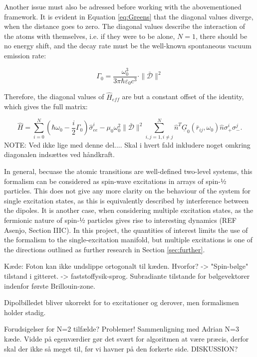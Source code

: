 \documentclass{article}
\begin{document}
Another issue must also be adressed before working with the abovementioned framework. It is evident in Equation \ref{eq:Greens} that the diagonal values diverge, when the distance goes to zero. The diagonal values describe the interaction of the atoms with themselves, i.e. if they were to be alone, $N = 1$, there should be no energy shift, and the decay rate must be the well-known spontaneous vacuum emission rate:

\begin{equation}\label{eq:vac_emission_rate}
    \Gamma_0 = \frac{\omega_0^3}{3\pi \hbar \varepsilon_0 c^3} \cdot \|\bar{\mathscr{D}}\|^2
\end{equation}

Therefore, the diagonal values of $\hat{H}_{eff}$ are but a constant offset of the identity, which gives the full matrix:

\begin{equation}
    \hat{H} = \sum_{i=0}^N (\hbar \omega_0 - \frac{i}{2}\Gamma_0) \hat{\sigma}_{ee}^{i} -\mu_0 \omega_0^2 \|\bar{\mathscr{D}}\|^2 \sum_{i,j = 1, i \neq j}^N \hat{n}^T \underline{G}_0(\bar{r}_{ij}, \omega_0) \hat{n} \sigma_+^i \sigma_-^j.
\end{equation}
NOTE: Ved ikke lige med denne del.... Skal i hvert fald inkludere noget omkring diagonalen indsættes ved håndkraft.

In general, becuase the atomic transitions are well-defined two-level systems, this formalism can be considered as spin-wave excitations in arrays of spin-½ particles. This does not give any more clarity on the behaviour of the system for single excitation states, as this is equivalently described by interference between the dipoles. It is another case, when considering multiple excitation states, as the fermionic nature of spin-½ particles gives rise to interesting dynamics (REF Asenjo, Section IIIC). In this project, the quantities of interest limits the use of the formalism to the single-excitation manifold, but multiple excitations is one of the directions outlined as further research in Section \ref{sec:further}. 

Kæde: Foton kan ikke undslippe ortogonalt til kæden. Hvorfor? -> "Spin-bølge" tilstand i gitteret. -> faststoffysik-sprog. Subradiante tilstande for bølgevektorer indenfor første Brillouin-zone. 

Dipolbilledet bliver ukorrekt for to excitationer og derover, men formalismen holder stadig. 

Forudsigelser for N=2 tilfælde? Problemer! Sammenligning med Adrian N=3 kæde. Vidde på egenværdier gør det svært for algoritmen at være præcis, derfor skal der ikke så meget til, før vi havner på den forkerte side.  DISKUSSION?
\end{document}
